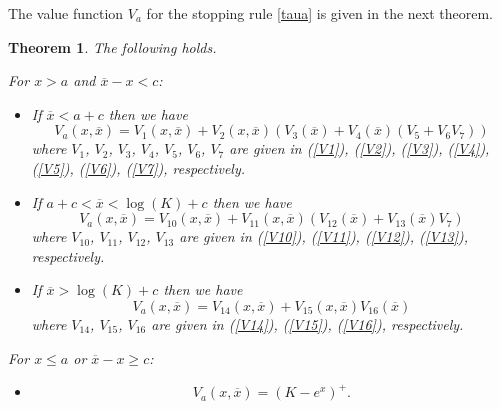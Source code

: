 \documentclass[10pt]{amsart}
\newtheorem{Thm}{Theorem}
\begin{document}
	The value function $V_a$ for the stopping rule \eqref{taua} is given in the next theorem.
	\begin{Thm}\label{valuea}
		The following holds.
		
		For $x > a$ and $\overline{x} - x < c$:
		\begin{itemize}
			\item[(i)]
			If $\overline{x} < a+c$ then we have
			\[V_a(x,\overline{x})= V_1(x,\overline{x}) + V_2(x,\overline{x}) ( V_3(\overline{x}) +  V_4(\overline{x})(  V_5 + V_6 V_7  )   )\]
			where  $V_1$, $V_2$, $V_3$, $V_4$, $V_5$, $V_6$, $V_7$ are given in (\ref{V1}), (\ref{V2}), (\ref{V3}), (\ref{V4}), (\ref{V5}), (\ref{V6}), (\ref{V7}), respectively.
			\item[(ii)] If $a+c < \overline{x} < \log(K)+c$ then we have
			\[V_a(x,\overline{x})= V_{10}(x,\overline{x}) + V_{11}(x,\overline{x}) ( V_{12}(\overline{x}) +  V_{13}(\overline{x})V_7   )\]
			where  $V_{10}$, $V_{11}$, $V_{12}$, $V_{13}$ are given in (\ref{V10}), (\ref{V11}), (\ref{V12}), (\ref{V13}), respectively.
			\item[(iii)] If $\overline{x} > \log(K)+c$ then we have
			\[V_a(x,\overline{x})= V_{14}(x,\overline{x}) + V_{15}(x,\overline{x}) V_{16}(\overline{x})\]
			where  $V_{14}$, $V_{15}$, $V_{16}$ are given in (\ref{V14}), (\ref{V15}), (\ref{V16}), respectively.
		\end{itemize}
		For $x \leq a$ or $\overline{x} - x \geq c$:
		\begin{itemize}
			\item[(iv)] \[V_a(x,\overline{x})= \left( K - e^x\right)^+. \]
		\end{itemize}
	\end{Thm}
\end{document}
